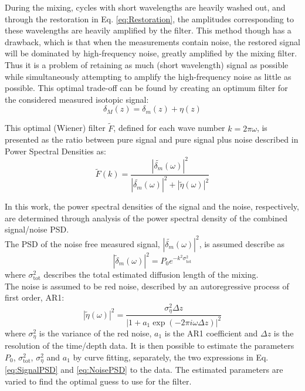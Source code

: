 \documentclass[../../CompleteThesis2/Complete_2ndDraft]{subfiles}
\begin{document}
During the mixing, cycles with short wavelengths are heavily washed out, and through the restoration in Eq. \ref{eq:Restoration}, the amplitudes corresponding to these wavelengths are heavily amplified by the filter. This method though has a drawback, which is that when the measurements contain noise, the restored signal will be dominated by high-frequency noise, greatly amplified by the mixing filter. Thus it is a problem of retaining as much (short wavelength) signal as possible while simultaneously attempting to amplify the high-frequency noise as little as possible. This optimal trade-off can be found by creating an optimum filter for the considered measured isotopic signal:
\begin{equation}
	\delta_M(z) = \delta_m (z) + \eta(z)
\end{equation} 

This optimal (Wiener) filter $\tilde{F}$, defined for each wave number $k = 2\pi \omega$, is presented as the ratio between pure signal and pure signal plus noise described in Power Spectral Densities as:
\begin{equation}
	\tilde{F}(k) =\frac{|\tilde{\delta_m}(\omega)|^2}{|\tilde{\delta_m}(\omega)|^2 + |\tilde{\eta}(\omega)|^2}
	\label{eq:WienerFilter}
\end{equation}

In this work, the power spectral densities of the signal and the noise, respectively, are determined through analysis of the power spectral density of the combined signal/noise PSD.\\
The PSD of the noise free measured signal, $|\tilde{\delta_m}(\omega)|^2$, is assumed describe as 
\begin{equation}
	|\tilde{\delta}_m(\omega)|^2 = P_0 e^{-k^2 \sigma_{\text{tot}}^2}
	\label{eq:SignalPSD}
\end{equation}
where $\sigma_{\text{tot}}^2$ describes the total estimated diffusion length of the mixing.\\
The noise is assumed to be red noise, described by an autoregressive process of first order, AR1:
\begin{equation}
	|\tilde{\eta}(\omega)|^2 = \frac{\sigma_{\eta}^2 \Delta z}{|1 + a_1 \exp(-2\pi i \omega \Delta z)|^2}
	\label{eq:NoisePSD}
\end{equation}
where $\sigma_{\eta}^2$ is the variance of the red noise, $a_1$ is the AR1 coefficient and $\Delta z$ is the resolution of the time/depth data.
It is then possible to estimate the parameters $P_0$, $\sigma_{\text{tot}}^2$, $\sigma_{\eta}^2$ and $a_1$ by curve fitting, separately, the two expressions in Eq. \ref{eq:SignalPSD} and \ref{eq:NoisePSD} to the data. The estimated parameters are varied to find the optimal guess to use for the filter.
\end{document}
